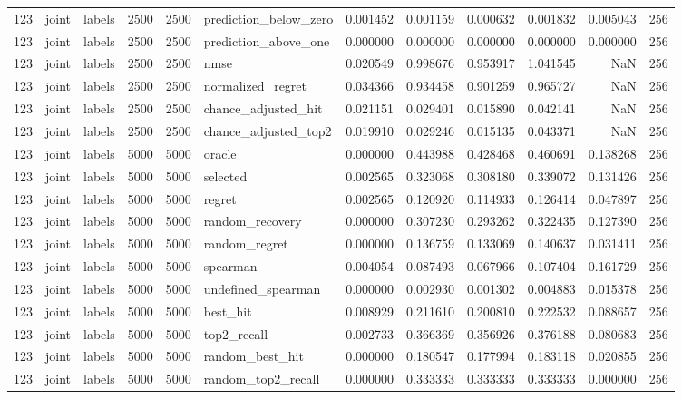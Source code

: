 \begin{tabular}{rllrrlrrrrrr}
123 & joint & labels & 2500 & 2500 & prediction_below_zero & 0.001452 & 0.001159 & 0.000632 & 0.001832 & 0.005043 & 256 \\
123 & joint & labels & 2500 & 2500 & prediction_above_one & 0.000000 & 0.000000 & 0.000000 & 0.000000 & 0.000000 & 256 \\
123 & joint & labels & 2500 & 2500 & nmse & 0.020549 & 0.998676 & 0.953917 & 1.041545 & NaN & 256 \\
123 & joint & labels & 2500 & 2500 & normalized_regret & 0.034366 & 0.934458 & 0.901259 & 0.965727 & NaN & 256 \\
123 & joint & labels & 2500 & 2500 & chance_adjusted_hit & 0.021151 & 0.029401 & 0.015890 & 0.042141 & NaN & 256 \\
123 & joint & labels & 2500 & 2500 & chance_adjusted_top2 & 0.019910 & 0.029246 & 0.015135 & 0.043371 & NaN & 256 \\
123 & joint & labels & 5000 & 5000 & oracle & 0.000000 & 0.443988 & 0.428468 & 0.460691 & 0.138268 & 256 \\
123 & joint & labels & 5000 & 5000 & selected & 0.002565 & 0.323068 & 0.308180 & 0.339072 & 0.131426 & 256 \\
123 & joint & labels & 5000 & 5000 & regret & 0.002565 & 0.120920 & 0.114933 & 0.126414 & 0.047897 & 256 \\
123 & joint & labels & 5000 & 5000 & random_recovery & 0.000000 & 0.307230 & 0.293262 & 0.322435 & 0.127390 & 256 \\
123 & joint & labels & 5000 & 5000 & random_regret & 0.000000 & 0.136759 & 0.133069 & 0.140637 & 0.031411 & 256 \\
123 & joint & labels & 5000 & 5000 & spearman & 0.004054 & 0.087493 & 0.067966 & 0.107404 & 0.161729 & 256 \\
123 & joint & labels & 5000 & 5000 & undefined_spearman & 0.000000 & 0.002930 & 0.001302 & 0.004883 & 0.015378 & 256 \\
123 & joint & labels & 5000 & 5000 & best_hit & 0.008929 & 0.211610 & 0.200810 & 0.222532 & 0.088657 & 256 \\
123 & joint & labels & 5000 & 5000 & top2_recall & 0.002733 & 0.366369 & 0.356926 & 0.376188 & 0.080683 & 256 \\
123 & joint & labels & 5000 & 5000 & random_best_hit & 0.000000 & 0.180547 & 0.177994 & 0.183118 & 0.020855 & 256 \\
123 & joint & labels & 5000 & 5000 & random_top2_recall & 0.000000 & 0.333333 & 0.333333 & 0.333333 & 0.000000 & 256 \\

\end{tabular}
